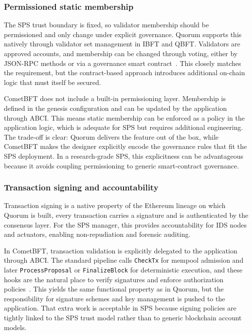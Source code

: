 \subsubsection{Permissioned static membership}
The SPS trust boundary is fixed, so validator membership should be permissioned and only change under explicit governance. Quorum supports this natively through validator set management in IBFT and QBFT. Validators are approved accounts, and membership can be changed through voting, either by JSON-RPC methods or via a governance smart contract~\cite{QBFTCons90:online}. This closely matches the requirement, but the contract-based approach introduces additional on-chain logic that must itself be secured.

CometBFT does not include a built-in permissioning layer. Membership is defined in the genesis configuration and can be updated by the application through ABCI. This means static membership can be enforced as a policy in the application logic, which is adequate for SPS but requires additional engineering. The trade-off is clear: Quorum delivers the feature out of the box, while CometBFT makes the designer explicitly encode the governance rules that fit the SPS deployment. In a research-grade SPS, this explicitness can be advantageous because it avoids coupling permissioning to generic smart-contract governance.

\subsubsection{Transaction signing and accountability}
Transaction signing is a native property of the Ethereum lineage on which Quorum is built, every transaction carries a signature and is authenticated by the consensus layer. For the SPS manager, this provides accountability for IDS nodes and actuators, enabling non-repudiation and forensic auditing.

In CometBFT, transaction validation is explicitly delegated to the application through ABCI. The standard pipeline calls \texttt{CheckTx} for mempool admission and later \texttt{ProcessProposal} or \texttt{FinalizeBlock} for deterministic execution, and these hooks are the natural place to verify signatures and enforce authorization policies~\cite{abciOverview}. This yields the same functional property as in Quorum, but the responsibility for signature schemes and key management is pushed to the application. That extra work is acceptable in SPS because signing policies are tightly linked to the SPS trust model rather than to generic blockchain account models.

